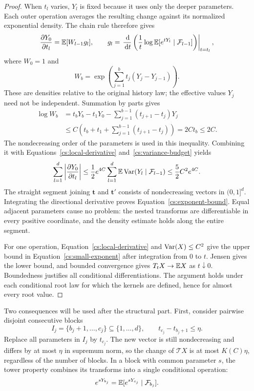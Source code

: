 \begin{proof}
When $t_l$ varies, $Y_l$ is fixed because it uses only the deeper
parameters. Each outer operation averages the resulting change against
its normalized exponential density. The chain rule therefore gives
\[
 \frac{\partial Y_0}{\partial t_l}=\mathbb E[W_{l-1}g_l],\qquad
 g_l=\left.\frac{\,\mathrm d}{\,\mathrm d t}
 \left(\frac1t\log\mathbb E[e^{tY_l}\mid\mathcal F_{l-1}]\right)
 \right|_{t=t_l},
\]
where $W_0=1$ and
\[
 W_b=\exp\left(\sum_{j=1}^b t_j(Y_j-Y_{j-1})\right).
\]
These are densities relative to the original history law; the effective
values $Y_j$ need not be independent. Summation by parts gives
\begin{align*}
 \log W_b
 &=t_bY_b-t_1Y_0-\sum_{j=1}^{b-1}(t_{j+1}-t_j)Y_j\\
 &\le C\left(t_b+t_1+\sum_{j=1}^{b-1}(t_{j+1}-t_j)\right)
 =2Ct_b\le2C.
\end{align*}
The nondecreasing order of the parameters is used in this inequality.
Combining it with Equations~\eqref{cs:local-derivative}
and~\eqref{cs:variance-budget} yields
\[
 \sum_{l=1}^d\left|\frac{\partial Y_0}{\partial t_l}\right|
 \le\frac12e^{4C}\sum_{l=1}^d
       \mathbb E\operatorname{Var}(Y_l\mid\mathcal F_{l-1})
 \le\frac52C^2e^{4C}.
\]
The straight segment joining $\mathbf t$ and $\mathbf t'$ consists of
nondecreasing vectors in $(0,1]^d$. Integrating the directional
derivative proves Equation~\eqref{cs:exponent-bound}. Equal adjacent
parameters cause no problem: the nested transforms are differentiable
in every positive coordinate, and the density estimate holds along the
entire segment.

For one operation, Equation~\eqref{cs:local-derivative} and
$\operatorname{Var}(X)\le C^2$ give the upper bound in
Equation~\eqref{cs:small-exponent} after integration from $0$ to $t$.
Jensen gives the lower bound, and bounded convergence gives
$T_tX\to\mathbb E X$ as $t\downarrow0$. Boundedness justifies all conditional
differentiations. The argument holds under each conditional root law for
which the kernels are defined, hence for almost every root value.
\end{proof}

Two consequences will be used after the structural part. First, consider
pairwise disjoint consecutive blocks
\[
 I_j=\{b_j+1,\ldots,c_j\}\subseteq\{1,\ldots,d\},
 \qquad t_{c_j}-t_{b_j+1}\le\eta.
\]
Replace all parameters in $I_j$ by $t_{c_j}$. The new vector is still
nondecreasing and differs by at most $\eta$ in supremum norm, so the
change of $\mathcal T X$ is at most $K(C)\eta$, regardless of the number
of blocks. In a block with common parameter $s$, the tower property
combines its transforms into a single conditional operation:
\[
 e^{sY_{b_j}}=\mathbb E[e^{sY_{c_j}}\mid\mathcal F_{b_j}].
\]

